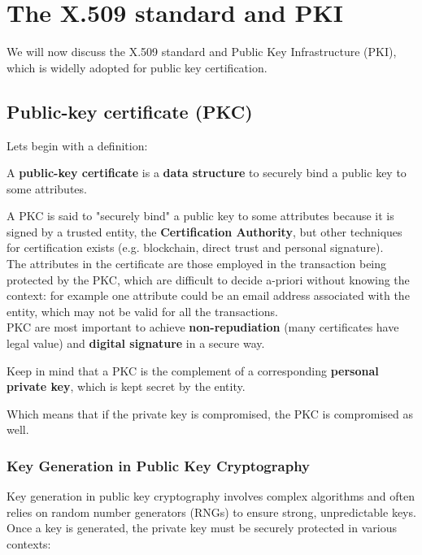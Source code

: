 \chapter{The X.509 standard and PKI}
We will now discuss the X.509 standard and Public Key Infrastructure 
(PKI), which is widelly adopted for public key certification.
\section{Public-key certificate (PKC)}
Lets begin with a definition:
\begin{boxH}
  A \textbf{public-key certificate} is a \textbf{data structure} to securely
  bind a public key to some attributes.
\end{boxH}
A PKC is said to "securely bind" a public key to some attributes
because it is signed by a trusted entity, the \textbf{Certification
Authority}, but other techniques for certification exists (e.g.
blockchain, direct trust and personal signature).\\
The attributes in the certificate are those employed in the
transaction being protected by the PKC, which are difficult to decide
a-priori without knowing the context: for example one attribute could
be an email address associated with the entity, which may not be valid
for all the transactions.\\
PKC are most important to achieve \textbf{non-repudiation} (many
certificates have legal value) and \textbf{digital signature} in a
secure way.\\
\begin{boxH}
  Keep in mind that a PKC is the complement of a corresponding
  \textbf{personal private key}, which is kept secret by the entity.
\end{boxH}
Which means that if the private key is compromised, the PKC is 
compromised as well.
\subsection{Key Generation in Public Key Cryptography}

Key generation in public key cryptography involves complex
algorithms and often relies on random number generators (RNGs) to
ensure strong, unpredictable keys. Once a key is generated, the
private key must be securely protected in various contexts:

